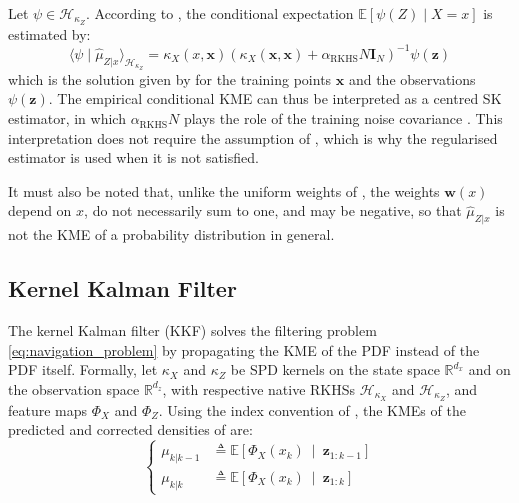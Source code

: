 \begin{remark}
	Let $\psi\in\mathcal{H}_{\kappa_Z}$. According to , the conditional expectation $\mathbb{E}[\psi(Z)\mid X=x]$ is estimated by:
	\begin{equation}
		\langle\psi\mid\hat{\mu}_{Z|x}\rangle_{\mathcal{H}_{\kappa_Z}}=\kappa_X(x,\mathbf{x})\left(\kappa_X(\mathbf{x},\mathbf{x})+\alpha_{\mathrm{RKHS}} N\mathbf{I}_N\right)^{-1}\psi(\mathbf{z})
	\end{equation}
	which is the solution given by  for the training points $\mathbf{x}$ and the observations $\psi(\mathbf{z})$. The empirical conditional KME can thus be interpreted as a centred SK estimator, in which $\alpha_{\mathrm{RKHS}} N$ plays the role of the training noise covariance \cite{bib:conditional-regression}. This interpretation does not require the assumption of , which is why the regularised estimator is used when it is not satisfied.

	It must also be noted that, unlike the uniform weights of , the weights $\mathbf{w}(x)$ depend on $x$, do not necessarily sum to one, and may be negative, so that $\hat{\mu}_{Z|x}$ is not the KME of a probability distribution in general.
\end{remark}

\subsection{Kernel Kalman Filter}

The kernel Kalman filter (KKF) \cite{bib:kernel-Kalman} solves the filtering problem \eqref{eq:navigation_problem} by propagating the KME of the PDF instead of the PDF itself. Formally, let $\kappa_X$ and $\kappa_Z$ be SPD kernels on the state space $\mathbb{R}^{d_x}$ and on the observation space $\mathbb{R}^{d_z}$, with respective native RKHSs $\mathcal{H}_{\kappa_X}$ and $\mathcal{H}_{\kappa_Z}$, and feature maps $\Phi_X$ and $\Phi_Z$. Using the index convention of , the KMEs of the predicted and corrected densities of  are:
\begin{equation}
	\left\{\begin{aligned}
	\mu_{k|k-1}&\triangleq\mathbb{E}\left[\Phi_X(x_k)\:\middle|\:\mathbf{z}_{1:k-1}\right]\\
	\mu_{k|k}&\triangleq\mathbb{E}\left[\Phi_X(x_k)\:\middle|\:\mathbf{z}_{1:k}\right]
	\end{aligned}\right.
\end{equation}


